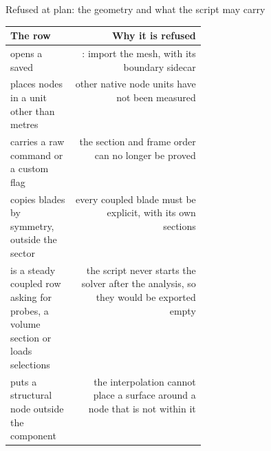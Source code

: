 \begin{frame}{Refused at plan: the geometry and what the script may carry}
\relax %
{\ftstablesize\renewcommand{\arraystretch}{1.12}
\begin{tabularx}{\linewidth}{@{}P{0.33\linewidth}R@{}}
\toprule
\textbf{The row} & \textbf{Why it is refused} \\
\midrule
opens a saved  & :
  import the mesh, with its boundary sidecar \\
places nodes in a unit other than metres & other native node units have not
  been measured \\
carries a raw command or a custom flag & the section and frame order can no
  longer be proved \\
copies blades by symmetry, outside the  sector & every
  coupled blade must be explicit, with its own sections \\
is a steady coupled row asking for probes, a volume section or loads
  selections & the script never starts the solver after the analysis, so they
  would be exported empty \\
puts a structural node outside the component & the interpolation cannot
  place a surface around a node that is not within it \\
\bottomrule
\end{tabularx}}
\end{frame}


